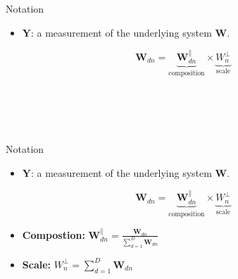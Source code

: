 \documentclass[
  ignorenonframetext,
]{beamer}
\providecommand{\tightlist}{%
  \setlength{\itemsep}{0pt}\setlength{\parskip}{0pt}}
\begin{document}
\begin{frame}{Notation}
\protect\hypertarget{notation}{}
\begin{itemize}
\tightlist
\item
  \(\mathbf{Y}\): a measurement of the underlying system \(\mathbf{W}\).
\end{itemize}

\[\mathbf{W}_{dn} = \underbrace{\mathbf{W}_{dn}^\parallel}_{\text{composition}} \times  \underbrace{W_n^\perp}_{\text{scale}}\]

\textcolor{white}{- **Compostion:** $\mathbf{W}_{dn}^\parallel = \frac{\mathbf{W}_{dn}}{\sum_{d=1}^D \mathbf{W}_{dn}}$}

\textcolor{white}{- **Scale:** $W_n^\perp = \sum_{d=1}^D \mathbf{W}_{dn}$}
\end{frame}

\begin{frame}{Notation}
\protect\hypertarget{notation-1}{}
\begin{itemize}
\tightlist
\item
  \(\mathbf{Y}\): a measurement of the underlying system \(\mathbf{W}\).
\end{itemize}

\[\mathbf{W}_{dn} = \underbrace{\mathbf{W}_{dn}^\parallel}_{\text{composition}} \times  \underbrace{W_n^\perp}_{\text{scale}}\]

\begin{itemize}
\item
  \textbf{Compostion:}
  \(\mathbf{W}_{dn}^\parallel = \frac{\mathbf{W}_{dn}}{\sum_{d=1}^D \mathbf{W}_{dn}}\)
\item
  \textbf{Scale:} \(W_n^\perp = \sum_{d=1}^D \mathbf{W}_{dn}\)
\end{itemize}
\end{frame}
\end{document}
